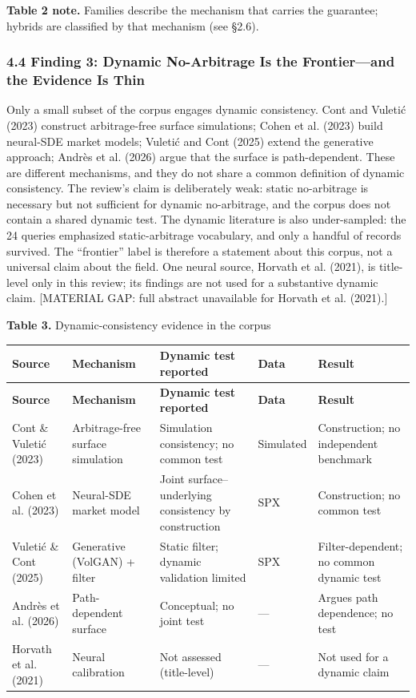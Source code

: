 \documentclass[11pt]{article}
\begin{document}
\textbf{Table 2 note.} Families describe the mechanism that carries the guarantee; hybrids are classified by that mechanism (see \S 2.6).

\subsubsection*{4.4 Finding 3: Dynamic No-Arbitrage Is the Frontier—and the Evidence Is Thin}
Only a small subset of the corpus engages dynamic consistency. Cont and Vuletić (2023) construct arbitrage-free surface simulations; Cohen et al. (2023) build neural-SDE market models; Vuletić and Cont (2025) extend the generative approach; Andrès et al. (2026) argue that the surface is path-dependent. These are different mechanisms, and they do not share a common definition of dynamic consistency. The review’s claim is deliberately weak: static no-arbitrage is necessary but not sufficient for dynamic no-arbitrage, and the corpus does not contain a shared dynamic test. The dynamic literature is also under-sampled: the 24 queries emphasized static-arbitrage vocabulary, and only a handful of records survived. The “frontier” label is therefore a statement about this corpus, not a universal claim about the field. One neural source, Horvath et al. (2021), is title-level only in this review; its findings are not used for a substantive dynamic claim. [MATERIAL GAP: full abstract unavailable for Horvath et al. (2021).]

\textbf{Table 3.} Dynamic-consistency evidence in the corpus

\begingroup\small
\begin{longtable}{@{}p{}p{}p{}p{}p{}@{}}
\toprule
\textbf{Source} & \textbf{Mechanism} & \textbf{Dynamic test reported} & \textbf{Data} & \textbf{Result} \\
\midrule
\endfirsthead
\toprule
\textbf{Source} & \textbf{Mechanism} & \textbf{Dynamic test reported} & \textbf{Data} & \textbf{Result} \\
\midrule
\endhead
Cont \& Vuletić (2023) & Arbitrage-free surface simulation & Simulation consistency; no common test & Simulated & Construction; no independent benchmark \\
Cohen et al. (2023) & Neural-SDE market model & Joint surface–underlying consistency by construction & SPX & Construction; no common test \\
Vuletić \& Cont (2025) & Generative (VolGAN) + filter & Static filter; dynamic validation limited & SPX & Filter-dependent; no common dynamic test \\
Andrès et al. (2026) & Path-dependent surface & Conceptual; no joint test & — & Argues path dependence; no test \\
Horvath et al. (2021) & Neural calibration & Not assessed (title-level) & — & Not used for a dynamic claim \\
\bottomrule
\end{longtable}
\endgroup
\end{document}
